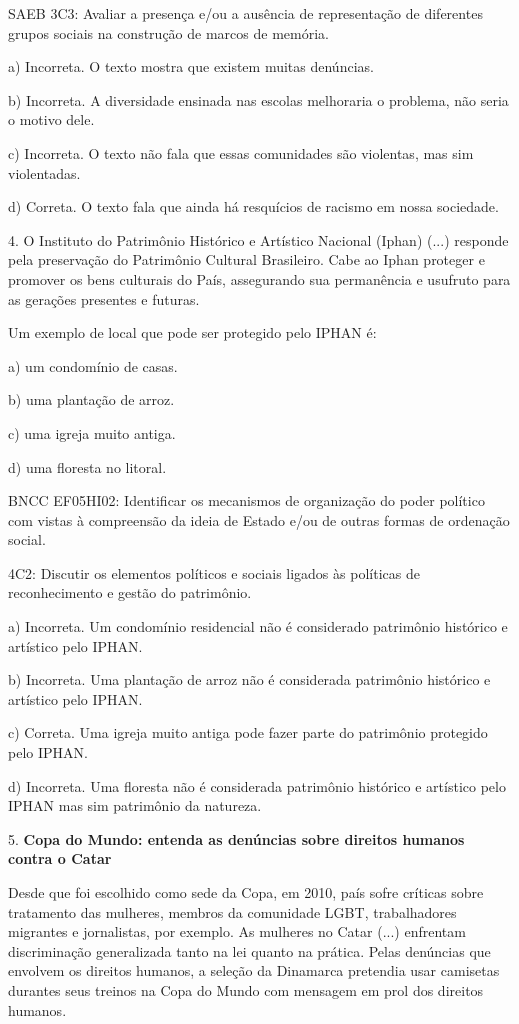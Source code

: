 SAEB 3C3: Avaliar a presença e/ou a ausência de representação de
diferentes grupos sociais na construção de marcos de memória.

a) Incorreta. O texto mostra que existem muitas denúncias.

b) Incorreta. A diversidade ensinada nas escolas melhoraria o problema,
não seria o motivo dele.

c) Incorreta. O texto não fala que essas comunidades são violentas, mas
sim violentadas.

d) Correta. O texto fala que ainda há resquícios de racismo em nossa
sociedade.

4. O Instituto do Patrimônio Histórico e Artístico Nacional (Iphan)
(...) responde pela preservação do Patrimônio Cultural Brasileiro. Cabe
ao Iphan proteger e promover os bens culturais do País, assegurando sua
permanência e usufruto para as gerações presentes e futuras.

Um exemplo de local que pode ser protegido pelo IPHAN é:

a) um condomínio de casas.

b) uma plantação de arroz.

c) uma igreja muito antiga.

d) uma floresta no litoral.

BNCC EF05HI02: Identificar os mecanismos de organização do poder
político com vistas à compreensão da ideia de Estado e/ou de outras
formas de ordenação social.

4C2: Discutir os elementos políticos e sociais ligados às políticas de
reconhecimento e gestão do patrimônio.

a) Incorreta. Um condomínio residencial não é considerado patrimônio
histórico e artístico pelo IPHAN.

b) Incorreta. Uma plantação de arroz não é considerada patrimônio
histórico e artístico pelo IPHAN.

c) Correta. Uma igreja muito antiga pode fazer parte do patrimônio
protegido pelo IPHAN.

d) Incorreta. Uma floresta não é considerada patrimônio histórico e
artístico pelo IPHAN mas sim patrimônio da natureza.

5. \textbf{Copa do Mundo: entenda as denúncias sobre direitos humanos
contra o Catar }

Desde que foi escolhido como sede da Copa, em 2010, país sofre críticas
sobre tratamento das mulheres, membros da comunidade LGBT, trabalhadores
migrantes e jornalistas, por exemplo. As mulheres no Catar (...)
enfrentam discriminação generalizada tanto na lei quanto na prática.
Pelas denúncias que envolvem os direitos humanos, a seleção da Dinamarca
pretendia usar camisetas durantes seus treinos na Copa do Mundo com
mensagem em prol dos direitos humanos.

